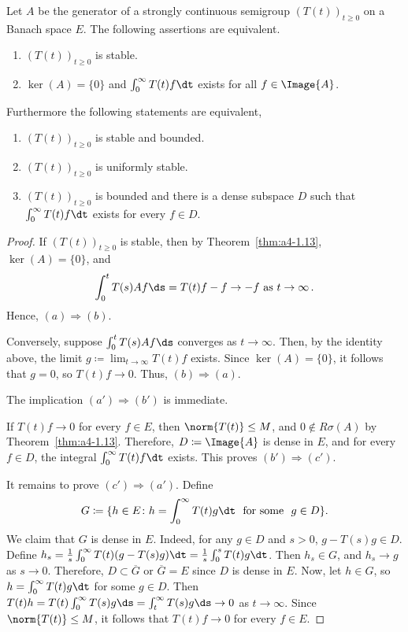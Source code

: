 \begin{theorem}\label{thm:a4-1.16}
Let $A$ be the generator of a strongly continuous semigroup $(T(t))_{t \geq 0}$ on a Banach space $E$. 
The following assertions are equivalent.
\begin{enumerate}[\upshape (a)]
\item 
$(T(t))_{t \geq 0}$ is stable.

\item 
$\ker(A) = \{0\}$ and $\int_{0}^{\infty} T(t)f  \dt$ exists for all $f \in \Image{A}$.

\end{enumerate}
Furthermore the following statements are equivalent,
\begin{enumerate}[(a')]
\item $(T(t))_{t \geq 0}$ is stable and bounded.
\item $(T(t))_{t \geq 0}$ is uniformly stable.
\item $(T(t))_{t \geq 0}$ is bounded and there is a dense subspace $D$ such that $\int_{0}^{\infty} T(t)f  \dt$ exists for every $f \in D$.
\end{enumerate}
\end{theorem}

\begin{proof}
If\/ $(T(t))_{t \geq 0}$ is stable, then by Theorem~\ref{thm:a4-1.13}, $\ker(A) = \{0\}$, and
\[{
\int_{0}^{t} T(s)Af  \ds = T(t)f - f \to -f \ \text{as} \ t \to \infty\,.
}\]
Hence, $(a) \Rightarrow (b)$.

Conversely, suppose $\int_{0}^{t} T(s)Af  \ds$ converges as $t \to \infty$. Then, by
the identity above, the limit $g \coloneqq \lim_{t \to \infty} T(t)f$ exists. 
Since $\ker(A) = \{0\}$, it follows that $g = 0$, so $T(t)f \to 0$. 
Thus, $(b) \Rightarrow (a)$.

The implication $(a') \Rightarrow (b')$ is immediate. 

If\/ $T(t)f \to 0$ for every $f \in E$, then $\norm{T(t)} \leq M$, and $0 \not\in R\sigma(A)$ by Theorem~\ref{thm:a4-1.13}. 
Therefore,
$D \coloneqq \Image{A}$ is dense in $E$, and for every $f \in D$, the integral $\int_{0}^{\infty} T(t)f  \dt$ exists. 
This proves $(b') \Rightarrow (c')$. 

It remains to prove $(c') \Rightarrow (a')$.
Define 
\[
G \coloneqq \{h \in E \colon h = \int_{0}^{\infty} T(t)g  \dt \ \text{ for some } \ g \in D\}.
\] 
We claim that $G$ is dense in $E$. 
Indeed, for any $g\in D$ and $s>0$,  $g - T(s)g \in D$.
Define $h_{s} = \frac{1}{s} \int_{0}^{\infty} T(t)(g - T(s)g)  \dt = \frac{1}{s} \int_{0}^{s} T(t)g  \dt$. 
Then $h_{s} \in G$,
and $h_{s} \to g$ as $s \to 0$. 
Therefore, $D \subset \overline{G}$ or $\overline{G} = E$ since $D$ is dense in $E$. 
Now, let $h \in G$, so $h=\int_0^\infty T(t)g\dt$ for some $g\in D$.
Then $T(t)h = T(t) \int_{0}^{\infty} T(s)g  \ds = \int_{t}^{\infty} T(s)g  \ds \to 0$ as $t \to \infty$. 
Since $\norm{T(t)} \leq M$, it follows that   $T(t)f \to 0$ for every $f \in E$.
\end{proof}

